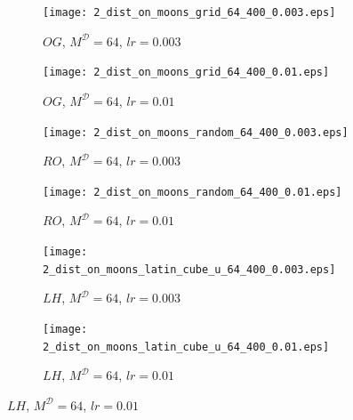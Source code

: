 \documentclass[shortabstract]{iithesis}
\begin{document}
\begin{figure}[!ht]
    \centering
    \begin{subfigure}{0.45\textwidth}
        \texttt{[image: 2\_dist\_on\_moons\_grid\_64\_400\_0.003.eps]}
        \caption{$OG$, $M^{\mathcal D} = 64$, $lr = 0.003$ }
    \end{subfigure}
    \begin{subfigure}{0.45\textwidth}
        \texttt{[image: 2\_dist\_on\_moons\_grid\_64\_400\_0.01.eps]}
        \caption{$OG$, $M^{\mathcal D} = 64$, $lr = 0.01$ }
    \end{subfigure}

    \begin{subfigure}{0.45\textwidth}
        \texttt{[image: 2\_dist\_on\_moons\_random\_64\_400\_0.003.eps]}
        \caption{$RO$, $M^{\mathcal D} = 64$, $lr = 0.003$ }
    \end{subfigure}
    \begin{subfigure}{0.45\textwidth}
        \texttt{[image: 2\_dist\_on\_moons\_random\_64\_400\_0.01.eps]}
        \caption{$RO$, $M^{\mathcal D} = 64$, $lr = 0.01$ }
    \end{subfigure}

    \begin{subfigure}{0.45\textwidth}
        \texttt{[image: 2\_dist\_on\_moons\_latin\_cube\_u\_64\_400\_0.003.eps]}
        \caption{$LH$, $M^{\mathcal D} = 64$, $lr = 0.003$ }
    \end{subfigure}
    \begin{subfigure}{0.45\textwidth}
        \texttt{[image: 2\_dist\_on\_moons\_latin\_cube\_u\_64\_400\_0.01.eps]}
        \caption{$LH$, $M^{\mathcal D} = 64$, $lr = 0.01$ }
    \end{subfigure}
\end{figure} 

\pagebreak
\end{document}
